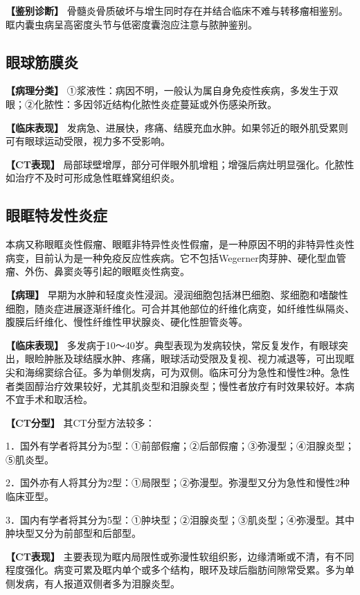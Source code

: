 \textbf{【鉴别诊断】}
骨髓炎骨质破坏与增生同时存在并结合临床不难与转移瘤相鉴别。眶内囊虫病呈高密度头节与低密度囊泡应注意与脓肿鉴别。

\subsection{眼球筋膜炎}

\textbf{【病理分类】}
①浆液性：病因不明，一般认为属自身免疫性疾病，多发生于双眼；②化脓性：多因邻近结构化脓性炎症蔓延或外伤感染所致。

\textbf{【临床表现】}
发病急、进展快，疼痛、结膜充血水肿。如果邻近的眼外肌受累则可有眼球运动受限，视力多不受影响。

\textbf{【CT表现】}
局部球壁增厚，部分可伴眼外肌增粗；增强后病灶明显强化。化脓性如治疗不及时可形成急性眶蜂窝组织炎。

\subsection{眼眶特发性炎症}

本病又称眼眶炎性假瘤、眼眶非特异性炎性假瘤，是一种原因不明的非特异性炎性病变，目前认为是一种免疫反应性疾病。它不包括Wegerner肉芽肿、硬化型血管瘤、外伤、鼻窦炎等引起的眼眶炎性病变。

\textbf{【病理】}
早期为水肿和轻度炎性浸润。浸润细胞包括淋巴细胞、浆细胞和嗜酸性细胞，随炎症进展逐渐纤维化。可合并其他部位的纤维化病变，如纤维性纵隔炎、腹膜后纤维化、慢性纤维性甲状腺炎、硬化性胆管炎等。

\textbf{【临床表现】}
多发病于10～40岁。典型表现为发病较快，常反复发作，有眼球突出，眼睑肿胀及球结膜水肿、疼痛，眼球活动受限及复视、视力减退等，可出现眶尖和海绵窦综合征。多为单侧发病，可为双侧。临床可分为急性和慢性2种。急性者类固醇治疗效果较好，尤其肌炎型和泪腺炎型；慢性者放疗有时效果较好。本病不宜手术和取活检。

\textbf{【CT分型】} 其CT分型方法较多：

1．国外有学者将其分为5型：①前部假瘤；②后部假瘤；③弥漫型；④泪腺炎型；⑤肌炎型。

2．国外亦有人将其分为2型：①局限型；②弥漫型。弥漫型又分为急性和慢性2种临床亚型。

3．国内有学者将其分为5型：①肿块型；②泪腺炎型；③肌炎型；④弥漫型。其中肿块型又分为前部型和后部型。

\textbf{【CT表现】}
主要表现为眶内局限性或弥漫性软组织影，边缘清晰或不清，有不同程度强化。病变可累及眶内单个或多个结构，眼环及球后脂肪间隙常受累。多为单侧发病，有人报道双侧者多为泪腺炎型。

